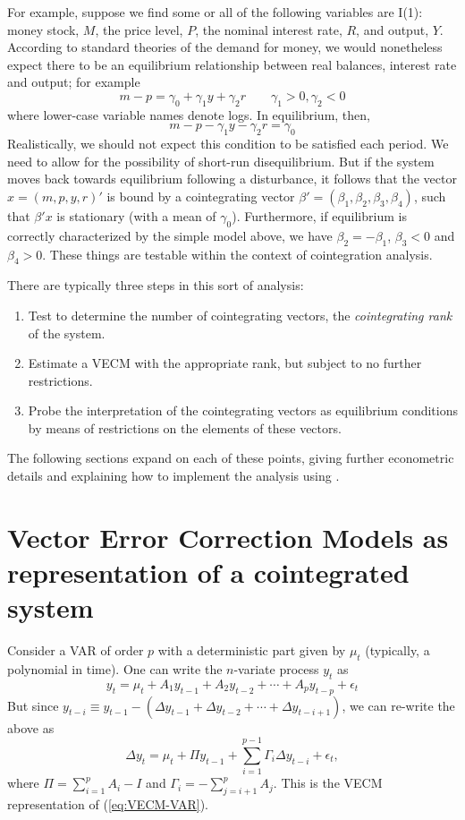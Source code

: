 For example, suppose we find some or all of the following variables
are I(1): money stock, $M$, the price level, $P$, the nominal interest
rate, $R$, and output, $Y$.  According to standard theories of the
demand for money, we would nonetheless expect there to be an
equilibrium relationship between real balances, interest rate and
output; for example
\[
m - p = \gamma_0 + \gamma_1 y + \gamma_2 r \qquad \gamma_1 > 0,
\gamma_2 < 0
\]
where lower-case variable names denote logs.  In equilibrium, then,
\[
m - p - \gamma_1 y - \gamma_2 r = \gamma_0
\]
Realistically, we should not expect this condition to be satisfied
each period.  We need to allow for the possibility of short-run
disequilibrium.  But if the system moves back towards equilibrium
following a disturbance, it follows that the vector $x = (m, p, y,
r)'$ is bound by a cointegrating vector $\beta' = (\beta_1, \beta_2,
\beta_3, \beta_4)$, such that $\beta'x$ is stationary (with a mean of
$\gamma_0$).  Furthermore, if equilibrium is correctly characterized
by the simple model above, we have $\beta_2 = -\beta_1$, $\beta_3 < 0$
and $\beta_4 > 0$.  These things are testable within the context of
cointegration analysis.

There are typically three steps in this sort of analysis:
\begin{enumerate}
\item Test to determine the number of cointegrating vectors, the 
  \emph{cointegrating rank} of the system.
\item Estimate a VECM with the appropriate rank, but subject to no
  further restrictions.
\item Probe the interpretation of the cointegrating vectors as
  equilibrium conditions by means of restrictions on the elements
  of these vectors.
\end{enumerate}

The following sections expand on each of these points, giving further
econometric details and explaining how to implement the analysis using
.


\section{Vector Error Correction Models as representation of a
  cointegrated system}
\label{sec:VECM-rep}

Consider a VAR of order $p$ with a deterministic part given by $\mu_t$
(typically, a polynomial in time). One can write the $n$-variate
process $y_t$ as
\begin{equation}
  \label{eq:VECM-VAR}
  y_t = \mu_t + A_1 y_{t-1} + A_2 y_{t-2} + \cdots + A_p y_{t-p} +
  \epsilon_t 
\end{equation}
But since $y_{t-i} \equiv y_{t-1} - (\Delta y_{t-1} + \Delta y_{t-2} +
\cdots + \Delta y_{t-i+1})$, we can re-write the above as
\begin{equation}
  \label{eq:VECM}
  \Delta y_t = \mu_t + \Pi y_{t-1} + \sum_{i=1}^{p-1} \Gamma_i \Delta
  y_{t-i} + \epsilon_t ,
\end{equation}
where $\Pi = \sum_{i=1}^p A_i - I$ and $\Gamma_i = -\sum_{j=i+1}^p A_j$.
This is the VECM representation of (\ref{eq:VECM-VAR}).

